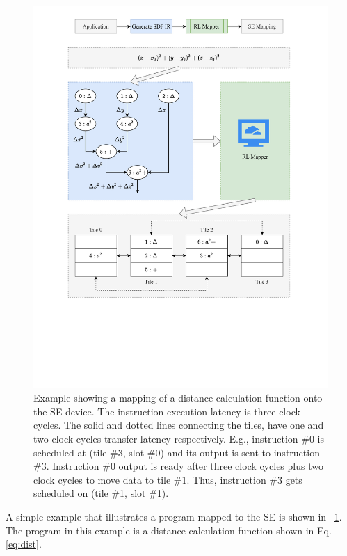 \begin{figure}
  \centering
  \includegraphics[trim=70 180 70 25, clip, width=\linewidth]{fig/SE_example.pdf}
  \caption{
    Example showing a mapping of a distance calculation function onto the SE device.
    The instruction execution latency is three clock cycles.
    The solid and dotted lines connecting the tiles, have one and two clock cycles transfer latency respectively.
    E.g., instruction \#0 is scheduled at (tile \#3, slot \#0) and its output is sent to instruction \#3.
    Instruction \#0 output is ready after three clock cycles plus two clock cycles to move data to tile \#1. 
    Thus, instruction \#3 gets scheduled on (tile \#1, slot \#1).
  }
  \label{fig:se_example}
\end{figure}

A simple example that illustrates a program mapped to the SE is shown in \figurename~\ref{fig:se_example}.
The program in this example is a distance calculation function shown in Eq. \ref{eq:dist}.

